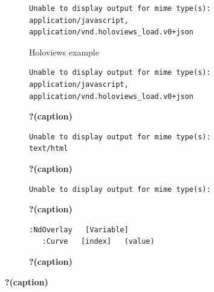 \documentclass[
  letterpaper,
  DIV=11,
  numbers=noendperiod]{scrreport}
\begin{document}
\begin{figure}

{\centering 

\begin{figure}

{\centering 

\begin{verbatim}
Unable to display output for mime type(s): application/javascript, application/vnd.holoviews_load.v0+json
\end{verbatim}

}

\caption{Holoviews example}

\end{figure}

\begin{figure}

{\centering 

\begin{verbatim}
Unable to display output for mime type(s): application/javascript, application/vnd.holoviews_load.v0+json
\end{verbatim}

}

\caption{\textbf{?(caption)}}

\end{figure}

\begin{figure}

{\centering 

\begin{verbatim}
Unable to display output for mime type(s): text/html
\end{verbatim}

}

\caption{\textbf{?(caption)}}

\end{figure}

\begin{figure}

{\centering 

\begin{verbatim}
Unable to display output for mime type(s): 
\end{verbatim}

}

\caption{\textbf{?(caption)}}

\end{figure}

\begin{figure}

{\centering 

\begin{verbatim}
:NdOverlay   [Variable]
   :Curve   [index]   (value)
\end{verbatim}

}

\caption{\textbf{?(caption)}}

\end{figure}

}

\caption{\label{fig-plot-copy}\textbf{?(caption)}}

\end{figure}
\end{document}
